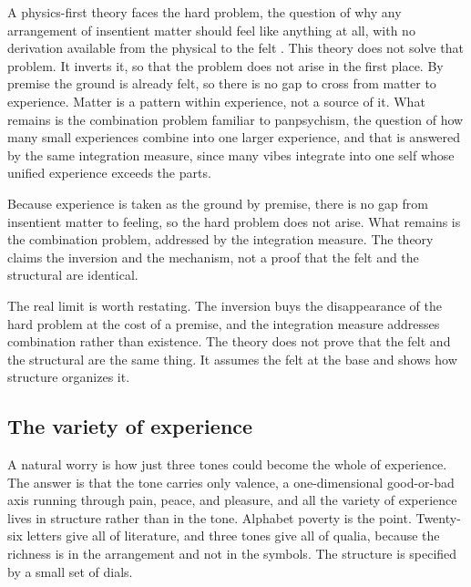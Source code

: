 A physics-first theory faces the hard problem, the question of why any arrangement of insentient matter should feel
like anything at all, with no derivation available from the physical to the felt \cite{chalmers1995}. This theory
does not solve that problem. It inverts it, so that the problem does not arise in the first place. By premise the
ground is already felt, so there is no gap to cross from matter to experience. Matter is a pattern within
experience, not a source of it. What remains is the combination problem familiar to panpsychism, the question of
how many small experiences combine into one larger experience, and that is answered by the same integration
measure, since many vibes integrate into one self whose unified experience exceeds the parts.

\begin{principle}
Because experience is taken as the ground by premise, there is no gap from insentient matter to feeling, so the
hard problem does not arise. What remains is the combination problem, addressed by the integration measure. The
theory claims the inversion and the mechanism, not a proof that the felt and the structural are identical.
\end{principle}

The real limit is worth restating. The inversion buys the disappearance of the hard problem at the cost of a
premise, and the integration measure addresses combination rather than existence. The theory does not prove that
the felt and the structural are the same thing. It assumes the felt at the base and shows how structure organizes
it.

\subsection{The variety of experience}

A natural worry is how just three tones could become the whole of experience. The answer is that the tone carries
only valence, a one-dimensional good-or-bad axis running through pain, peace, and pleasure, and all the variety of
experience lives in structure rather than in the tone. Alphabet poverty is the point. Twenty-six letters give all
of literature, and three tones give all of qualia, because the richness is in the arrangement and not in the
symbols. The structure is specified by a small set of dials.

